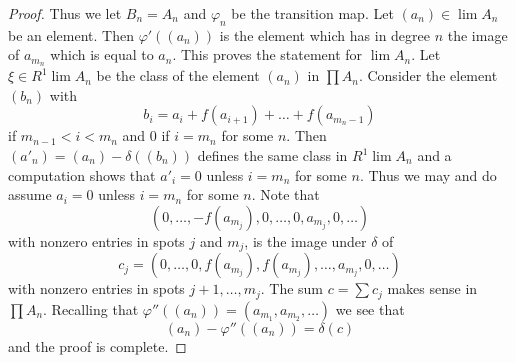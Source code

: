 \begin{proof}
\medskip\noindent
Thus we let $B_n = A_n$ and $\varphi_n$ be the transition map.
Let $(a_n) \in \lim A_n$ be an element. Then $\varphi'((a_n))$
is the element which has in degree $n$ the image of $a_{m_n}$
which is equal to $a_n$. This proves the statement for $\lim A_n$.
Let $\xi \in R^1\lim A_n$ be the class of the element
$(a_n)$ in $\prod A_n$. Consider the element $(b_n)$ with
$$
b_i = a_i + f(a_{i + 1}) + \ldots + f(a_{m_n - 1})
$$
if $m_{n - 1} < i < m_n$ and $0$ if $i = m_n$ for some $n$.
Then $(a'_n) = (a_n) - \delta((b_n))$ defines the same class
in $R^1\lim A_n$ and a computation shows that $a'_i = 0$
unless $i = m_n$ for some $n$. Thus we may and do assume $a_i = 0$
unless $i = m_n$ for some $n$. Note that
$$
(0, \ldots, -f(a_{m_j}), 0, \ldots, 0, a_{m_j}, 0, \ldots)
$$
with nonzero entries in spots $j$ and $m_j$, is the image under $\delta$ of
$$
c_j = (0, \ldots, 0, f(a_{m_j}), f(a_{m_j}), \ldots, a_{m_j}, 0, \ldots)
$$
with nonzero entries in spots $j + 1, \ldots, m_j$. The sum
$c = \sum c_j$ makes sense in $\prod A_n$. Recalling that
$\varphi''((a_n)) = (a_{m_1}, a_{m_2}, \ldots)$ we see that
$$
(a_n) - \varphi''((a_n)) = \delta(c)
$$
and the proof is complete.
\end{proof}
